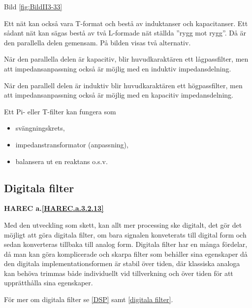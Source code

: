 Bild \ref{fig:BildII3-33}

Ett nät kan också vara T-format och bestå av induktanser och kapacitanser. Ett
sådant nät kan sägas bestå av två L-formade nät ställda ''rygg mot rygg''. Då är
den parallella delen gemensam. På bilden visas två alternativ.

När den parallella delen är kapacitiv, blir huvudkaraktären ett lågpassfilter,
men att impedansanpassning också är möjlig med en induktiv impedansdelning.

När den parallell delen är induktiv blir huvudkaraktären ett högpassfilter, men
att impedansanpassning också är möjlig med en kapacitiv impedansdelning.

Ett Pi- eller T-filter kan fungera som
\begin{itemize}
\item svängningskrets,
\item impedanstransformator (anpassning),
\item balansera ut en reaktans o.s.v.
\end{itemize}

\subsection{Digitala filter}
\textbf{HAREC a.\ref{HAREC.a.3.2.13}\label{myHAREC.a.3.2.13}}

Med den utveckling som skett, kan allt mer processing ske digitalt, det gör
det möjligt att göra digitala filter, om bara signalen konveterats till
digital form och sedan konverteras tillbaka till analog form.
Digitala filter har en många fördelar, då man kan göra komplicerade och
skarpa filter som behåller sina egenskaper då den digitala implementationsformen
är stabil över tiden, där klassiska analoga kan behöva trimmas både
individuellt vid tillverkning och över tiden för att upprätthålla sina
egenskaper.

För mer om digitala filter se \ref{DSP} samt \ref{digitala filter}.
